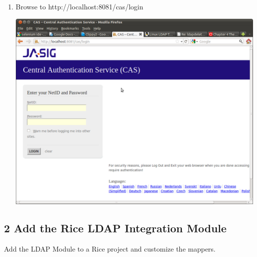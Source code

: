 \begin{enumerate}
\begin{lstlisting}[numbers=left,language=xml,basicstyle=\scriptsize,backgroundcolor=\color{ubergray},caption={src/main/resources/custom.properties},frame=single,breaklines=true]
       <param name="filter.validation.class">org.jasig.cas.client.validation.Cas20ProxyReceivingTicketValidationFilter</param>
       <param name="filter.validation.casServerUrlPrefix">${cas.url}</param>
       <param name="filter.validation.serverName">${application.host}:${http.port}</param>
       <param name="filtermapping.validation.2">/*</param>

       <param name="filter.caswrapper.class">org.jasig.cas.client.util.HttpServletRequestWrapperFilter</param>
       <param name="filtermapping.caswrapper.3">/*</param>
\end{lstlisting}
\item Browse to http://localhost:8081/cas/login

\includegraphics[width=\textwidth]{images/Screenshot16.png}

\end{enumerate}

\subsection*{2 Add the Rice LDAP Integration Module}
Add the LDAP Module to a Rice project and customize the mappers.

